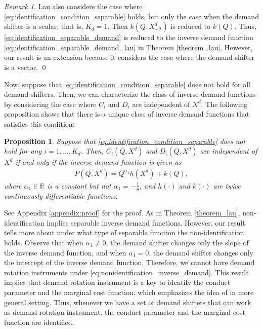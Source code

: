 \documentclass[11pt, a4paper]{article}
\newtheorem{proposition}{Proposition}
\theoremstyle{remark}
\newtheorem{remark}{Remark}
\begin{document}
\begin{remark}
    Lau also considers the case where \eqref{eq:identification_condition_separable} holds, but only the case when the demand shifter is a scalar, that is, $K_d = 1$.
    Then $k(Q, X^{d}_{-\mathcal{I}})$ is reduced to $k(Q)$.
    Thus, \eqref{eq:identification_separable_demand} is reduced to the inverse demand function \eqref{eq:identification_separable_demand_lau} in Theorem \ref{theorem_lau}.
    However, our result is an extension because it considers the case where the demand shifter is a vector. \qed
\end{remark}

Now, suppose that \eqref{eq:identification_condition_separable} does not hold for all demand shifters.
Then, we can characterize the class of inverse demand functions by considering the case where $C_i$ and $D_i$ are independent of $X^{d}$.
The following proposition shows that there is a unique class of inverse demand functions that satisfies this condition:
\begin{proposition}\label{proposition:nonidentification_inverse_demand}
    Suppose that \eqref{eq:identification_condition_separable} does not hold for any $i = 1, \ldots, K_d$.
    Then, $C_i(Q, X^{d})$ and $D_i(Q, X^{d})$ are independent of $X^{d}$ if and only if the inverse demand function is given as \begin{align}
        P(Q, X^{d}) = Q^{\alpha_1}h(X^{d}) + k(Q), \label{eq:nonidentification_inverse_demand}
    \end{align}
    where $\alpha_1 \in \mathbb{R}$ is a constant but not $\alpha_1 = -\frac{1}{\theta}$, and $h(\cdot)$ and $k(\cdot)$ are twice continuously differentiable functions.
\end{proposition}
See Appendix \ref{appendix:proof} for the proof.
As in Theorem \ref{theorem_lau}, non-identification implies separable inverse demand functions.
However, our result tells more about under what type of separable function the non-identification holds.
Observe that when $\alpha_1 \ne 0$, the demand shifter changes only the slope of the inverse demand function, and when $\alpha_1 = 0$, the demand shifter changes only the intercept of the inverse demand function.
Therefore, we cannot have demand rotation instruments under \eqref{eq:nonidentification_inverse_demand}.
This result implies that demand rotation instrument is a key to identify the conduct parameter and the marginal cost function, which emphasizes the idea of \citet{bresnahan1982oligopoly} in more general setting.
Thus, whenever we have a set of demand shifters that can work as demand rotation instrument, the conduct parameter and the marginal cost function are identified.
\end{document}
